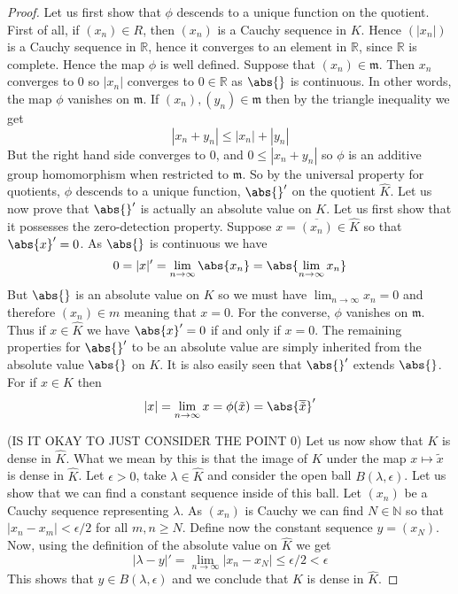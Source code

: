 \documentclass{article}
\newcommand{\mfrak}[1]{\mathfrak{#1}}
\newcommand{\mbb}[1]{\mathbb{#1}}
\begin{document}
\begin{proof}
    Let us first show that $\phi$ descends to a unique function on the quotient. First of all, if $(x_n) \in R$, then $(x_n)$ is a Cauchy sequence in $K$. Hence  $(|x_n|)$ is a Cauchy sequence in $\mbb R$, hence it converges to an element in $\mbb R$, since $\mbb R$ is complete. Hence the map $\phi$ is well defined. Suppose that $(x_n) \in \mfrak m$. Then $x_n$ converges to $0$ so $|x_n|$ converges to $0 \in \mbb R$ as $\abs{}$ is continuous. In other words, the map $\phi$ vanishes on $\mfrak m$. If $(x_n), (y_n) \in \mfrak m$ then by the triangle inequality we get 
    $$|x_n + y_n| \leq |x_n| + |y_n|$$
    But the right hand side converges to 0, and $0 \leq |x_n + y_n|$ so $\phi$ is an additive group homomorphism when restricted to $\mfrak m$. So by the universal property for quotients, $\phi$ descends to a unique function, $\abs{}'$ on the quotient $\hat K$. Let us now prove that $\abs{}'$ is actually an absolute value on $K$. Let us first show that it possesses the zero-detection property. Suppose $x = \overline {(x_n)} \in \hat K$ so that $\abs{x}' = 0$. As $\abs{}$ is continuous we have
    $$0 = |x|' = \lim_{n \to \infty} \abs{x_n} =  \abs {\lim_{n \to \infty} x_n}$$
    But $\abs{}$ is an absolute value on $K$ so we must have 
    $\lim_{n \to \infty} x_n = 0$ and therefore $(x_n) \in m$ meaning that $x = 0$. For the converse, $\phi$ vanishes on $\mfrak m$. Thus if $x \in \hat K$ we have $\abs{x}' = 0$ if and only if $x = 0$. The remaining properties for $\abs{}'$ to be an absolute value are simply inherited from the absolute value $\abs{}$ on $K$. It is also easily seen that $\abs{}'$ extends $\abs{}$. For if $x \in K$ then 
    $$|x| = \lim_{n \to \infty} x = \phi(\tilde x) = \abs{\overline{ \tilde {x}}}'$$

    (IS IT OKAY TO JUST CONSIDER THE POINT 0)
    Let us now show that $K$ is dense in $\hat K$. What we mean by this is that the image of $K$ under the map $x \mapsto \tilde x$ is dense in $\hat K$. Let $\epsilon > 0$, take $\lambda \in \hat K$ and consider the open ball $B(\lambda, \epsilon)$. Let us show that we can find a constant sequence inside of this ball. Let $(x_n)$ be a Cauchy sequence representing $\lambda$. As $(x_n)$ is Cauchy we can find $N \in \mbb N$ so that $|x_n - x_m| < \epsilon / 2$ for all $m,n \geq N$. Define now the constant sequence $y = (x_N)$. Now, using the definition of the absolute value on $\hat K$ we get
    $$|\lambda - y|' = \lim_{n \to \infty} |x_n - x_N| \leq \epsilon/2 < \epsilon$$
    This shows that $y \in B(\lambda, \epsilon)$ and we conclude that $K$ is dense in $\hat K$.
    

\end{proof}
\end{document}
